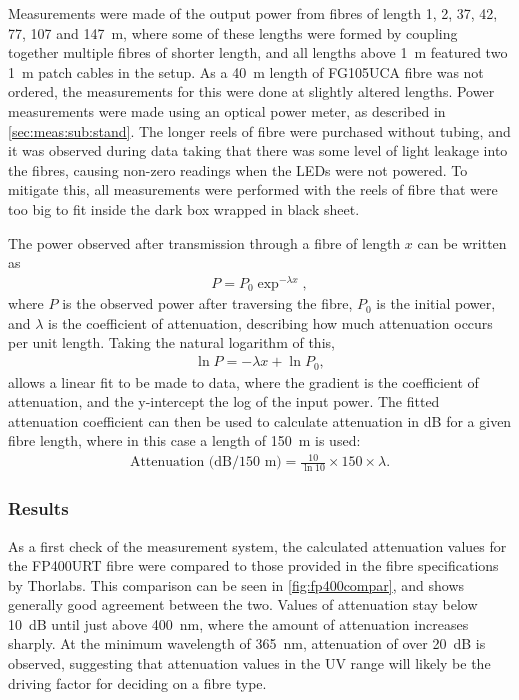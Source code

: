 \documentclass[a4paper,11pt]{article}
\begin{document}
Measurements were made of the output power from fibres of length 1, 2, 37, 42, 77, 107 and 147~m, where some of these lengths were formed by coupling together multiple fibres of shorter length, and all lengths above 1~m featured two 1~m patch cables in the setup. As a 40~m length of FG105UCA fibre was not ordered, the measurements for this were done at slightly altered lengths. Power measurements were made using an optical power meter, as described in \cref{sec:meas:sub:stand}. The longer reels of fibre were purchased without tubing, and it was observed during data taking that there was some level of light leakage into the fibres, causing non-zero readings when the LEDs were not powered. To mitigate this, all measurements were performed with the reels of fibre that were too big to fit inside the dark box wrapped in black sheet.

The power observed after transmission through a fibre of length $x$ can be written as
\begin{eqnarray}
P = P_0\exp^{-\lambda x},
\end{eqnarray}
where $P$ is the observed power after traversing the fibre, $P_0$ is the initial power, and $\lambda$ is the coefficient of attenuation, describing how much attenuation occurs per unit length. Taking the natural logarithm of this,
\begin{eqnarray}
\ln P = -\lambda x + \ln P_0,
\end{eqnarray}
allows a linear fit to be made to data, where the gradient is the coefficient of attenuation, and the y-intercept the log of the input power. The fitted attenuation coefficient can then be used to calculate attenuation in dB for a given fibre length, where in this case a length of 150~m is used:
\begin{eqnarray}
\text{Attenuation (dB/150~m)} = \frac{10}{\ln 10}\times 150 \times \lambda.
\end{eqnarray}

\subsubsection{Results}
As a first check of the measurement system, the calculated attenuation values for the FP400URT fibre were compared to those provided in the fibre specifications by Thorlabs. This comparison can be seen in \cref{fig:fp400compar}, and shows generally good agreement between the two. Values of attenuation stay below 10~dB until just above 400~nm, where the amount of attenuation increases sharply. At the minimum wavelength of 365~nm, attenuation of over 20~dB is observed, suggesting that attenuation values in the UV range will likely be the driving factor for deciding on a fibre type.
\end{document}
